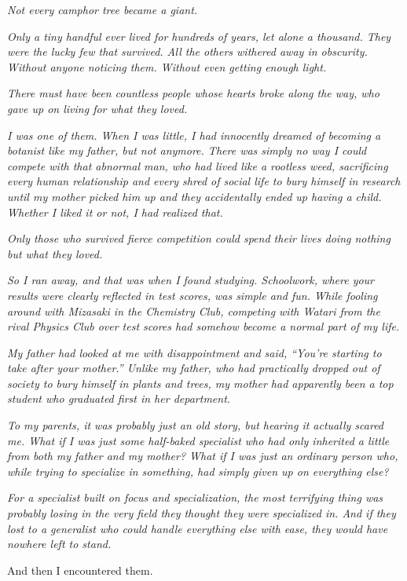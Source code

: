 \documentclass[
    a4paper,
    12pt,
    twoside,
    openany,
    UTF8,
    fontset=windows
]{ctexbook}
\begin{document}
\textit{Not every camphor tree became a giant.}

\textit{Only a tiny handful ever lived for hundreds of years, let alone a thousand. They were the lucky few that survived. All the others withered away in obscurity. Without anyone noticing them. Without even getting enough light.}

\textit{There must have been countless people whose hearts broke along the way, who gave up on living for what they loved.}

\textit{I was one of them. When I was little, I had innocently dreamed of becoming a botanist like my father, but not anymore. There was simply no way I could compete with that abnormal man, who had lived like a rootless weed, sacrificing every human relationship and every shred of social life to bury himself in research until my mother picked him up and they accidentally ended up having a child. Whether I liked it or not, I had realized that.}

\textit{Only those who survived fierce competition could spend their lives doing nothing but what they loved.}

\textit{So I ran away, and that was when I found studying. Schoolwork, where your results were clearly reflected in test scores, was simple and fun. While fooling around with Mizasaki in the Chemistry Club, competing with Watari from the rival Physics Club over test scores had somehow become a normal part of my life.}

\textit{My father had looked at me with disappointment and said, ``You're starting to take after your mother.'' Unlike my father, who had practically dropped out of society to bury himself in plants and trees, my mother had apparently been a top student who graduated first in her department.}

\textit{To my parents, it was probably just an old story, but hearing it actually scared me. What if I was just some half-baked specialist who had only inherited a little from both my father and my mother? What if I was just an ordinary person who, while trying to specialize in something, had simply given up on everything else?}

\textit{For a specialist built on focus and specialization, the most terrifying thing was probably losing in the very field they thought they were specialized in. And if they lost to a generalist who could handle everything else with ease, they would have nowhere left to stand.}

And then I encountered them.
\end{document}
